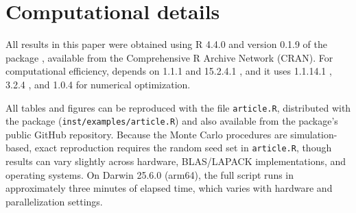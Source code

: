 \section*{Computational details}\label{computational-details}

All results in this paper were obtained using R 4.4.0 \citep{r2024} and version 0.1.9 of the package , available from the Comprehensive R Archive Network (CRAN). For computational efficiency,  depends on  1.1.1 \citep{eddetal2018} and  15.2.4.1 \citep{eddsan2024}, and it uses  1.1.14.1 \citep{xiaetal2013},  3.2.4 \citep{scrucca2013}, and  1.0.4 \citep{psopack} for numerical optimization.

All tables and figures can be reproduced with the file \texttt{article.R}, distributed with the  package (\texttt{inst/examples/article.R}) and also available from the package's public GitHub repository. Because the Monte Carlo procedures are simulation-based, exact reproduction requires the random seed set in \texttt{article.R}, though results can vary slightly across hardware, BLAS/LAPACK implementations, and operating systems. On Darwin 25.6.0 (arm64), the full script runs in approximately three minutes of elapsed time, which varies with hardware and parallelization settings.



\address{%
Gabriel Rodriguez-Rondon\\
Bank of Canada\\%
Canadian Economic Analysis Department\\ Ottawa, ON, Canada\\
%
\url{https://grodriguezrondon.com}\\%
\textit{ORCiD: \href{https://orcid.org/0009-0005-3769-9921}{0009-0005-3769-9921}}\\%
\href{mailto:grodriguezrondon@bankofcanada.ca}{\nolinkurl{grodriguezrondon@bankofcanada.ca}}%
}

\address{%
Jean-Marie Dufour\\
McGill University\\%
Department of Economics\\ Montreal, QC, Canada\\
%
\url{http://www.jeanmariedufour.com}\\%
\textit{ORCiD: \href{https://orcid.org/0000-0002-7731-2278}{0000-0002-7731-2278}}\\%
\href{mailto:jean-marie.dufour@mcgill.ca}{\nolinkurl{jean-marie.dufour@mcgill.ca}}%
}

